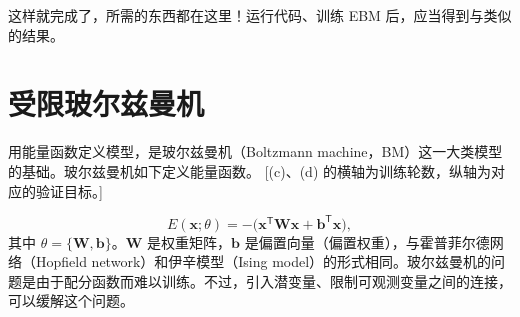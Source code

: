 
这样就完成了，所需的东西都在这里！运行代码、训练 EBM 后，应当得到与类似的结果。

\section{受限玻尔兹曼机}
用能量函数定义模型，是玻尔兹曼机（Boltzmann machine，BM）这一大类模型的基础。玻尔兹曼机如下定义能量函数。
[(c)、(d) 的横轴为训练轮数，纵轴为对应的验证目标。]

\begin{equation}
E(\mathbf{x};\theta)=-\bigl(\mathbf{x}^{\mathsf T}\mathbf{W}\mathbf{x}+
                                 \mathbf{b}^{\mathsf T}\mathbf{x}\bigr),
\tag{7.32}\label{eq:07-32}
\end{equation}
其中 $\theta=\{\mathbf{W},\mathbf{b}\}$。$\mathbf{W}$ 是权重矩阵，$\mathbf{b}$ 是偏置向量（偏置权重），与霍普菲尔德网络（Hopfield network）和伊辛模型（Ising model）的形式相同。玻尔兹曼机的问题是由于配分函数而难以训练。不过，引入潜变量、限制可观测变量之间的连接，可以缓解这个问题。

